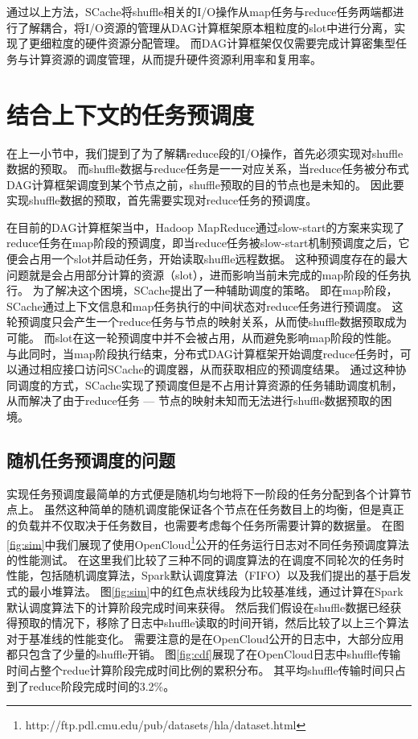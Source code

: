 通过以上方法，SCache将shuffle相关的I/O操作从map任务与reduce任务两端都进行了解耦合，将I/O资源的管理从DAG计算框架原本粗粒度的slot中进行分离，实现了更细粒度的硬件资源分配管理。
而DAG计算框架仅仅需要完成计算密集型任务与计算资源的调度管理，从而提升硬件资源利用率和复用率。

\section{结合上下文的任务预调度}

在上一小节中，我们提到了为了解耦reduce段的I/O操作，首先必须实现对shuffle数据的预取。
而shuffle数据与reduce任务是一一对应关系，当reduce任务被分布式DAG计算框架调度到某个节点之前，shuffle预取的目的节点也是未知的。
因此要实现shuffle数据的预取，首先需要实现对reduce任务的预调度。

在目前的DAG计算框架当中，Hadoop MapReduce通过slow-start\cite{hadoop}的方案来实现了reduce任务在map阶段的预调度，即当reduce任务被slow-start机制预调度之后，它便会占用一个slot并启动任务，开始读取shuffle远程数据。
这种预调度存在的最大问题就是会占用部分计算的资源（slot），进而影响当前未完成的map阶段的任务执行。
为了解决这个困境，SCache提出了一种辅助调度的策略。
即在map阶段，SCache通过上下文信息和map任务执行的中间状态对reduce任务进行预调度。
这轮预调度只会产生一个reduce任务与节点的映射关系，从而使shuffle数据预取成为可能。
而slot在这一轮预调度中并不会被占用，从而避免影响map阶段的性能。
与此同时，当map阶段执行结束，分布式DAG计算框架开始调度reduce任务时，可以通过相应接口访问SCache的调度器，从而获取相应的预调度结果。
通过这种协同调度的方式，SCache实现了预调度但是不占用计算资源的任务辅助调度机制，从而解决了由于reduce任务 --- 节点的映射未知而无法进行shuffle数据预取的困境。

\subsection{随机任务预调度的问题}

实现任务预调度最简单的方式便是随机均匀地将下一阶段的任务分配到各个计算节点上。
虽然这种简单的随机调度能保证各个节点在任务数目上的均衡，但是真正的负载并不仅取决于任务数目，也需要考虑每个任务所需要计算的数据量。
在图\ref{fig:sim}中我们展现了使用OpenCloud\footnote{http://ftp.pdl.cmu.edu/pub/datasets/hla/dataset.html}公开的任务运行日志对不同任务预调度算法的性能测试。
在这里我们比较了三种不同的调度算法的在调度不同轮次的任务时性能，包括随机调度算法，Spark默认调度算法（FIFO）\cite{apachespark}以及我们提出的基于启发式的最小堆算法。
图\ref{fig:sim}中的红色点状线段为比较基准线，通过计算在Spark默认调度算法下的计算阶段完成时间来获得。
然后我们假设在shuffle数据已经获得预取的情况下，移除了日志中shuffle读取的时间开销，然后比较了以上三个算法对于基准线的性能变化。
需要注意的是在OpenCloud公开的日志中，大部分应用都只包含了少量的shuffle开销。
图\ref{fig:cdf}展现了在OpenCloud日志中shuffle传输时间占整个redue计算阶段完成时间比例的累积分布。
其平均shuffle传输时间只占到了reduce阶段完成时间的3.2\%。

